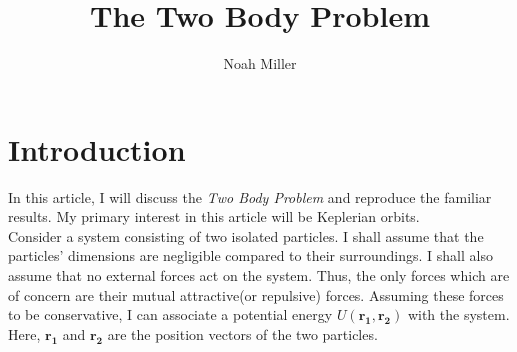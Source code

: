 \documentclass[12pt, letterpaper]{article}
\begin{document}
\title{The Two Body Problem}
\author{Noah Miller}
\maketitle
\section{Introduction}
In this article, I will discuss the \textit{Two Body Problem} and reproduce the familiar results. My primary interest in this article will be Keplerian orbits. \\
Consider a system consisting of two isolated particles. I shall assume that the particles' dimensions are negligible compared to their surroundings. 
I shall also assume that no external forces act on the system. Thus, the only forces which are of concern are their mutual attractive(or repulsive) forces. 
Assuming these forces to be conservative, I can associate a potential energy $U(\mathbf{r_1},\mathbf{r_2})$ with the system. 
Here, $\mathbf{r_1}$ and $\mathbf{r_2}$ are the position vectors of the two particles.
\end{document}
